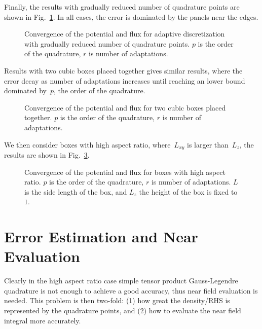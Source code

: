 \documentclass[prb,preprintnumbers,amsmath,amssymb, 10pt]{revtex4}
\begin{document}
Finally, the results with gradually reduced number of quadrature points are shown in Fig.~\ref{fig:3d-box-reduced-adapt-convergence}.
In all cases, the error is dominated by the panels near the edges.

\begin{figure}[htbp]
    \centering
    
    \caption{Convergence of the potential and flux for adaptive discretization with gradually reduced number of quadrature points. $p$ is the order of the quadrature, $r$ is number of adaptations.}
    \label{fig:3d-box-reduced-adapt-convergence}
\end{figure}

Results with two cubic boxes placed together gives similar results, where the error decay as number of adaptations increases until reaching an lower bound dominated by~$p$, the order of the quadrature.

\begin{figure}[htbp]
    \centering
    
    \caption{Convergence of the potential and flux for two cubic boxes placed together. $p$ is the order of the quadrature, $r$ is number of adaptations.}
    \label{fig:3d-double-box-convergence}
\end{figure}

We then consider boxes with high aspect ratio, where~$L_{xy}$ is larger than~$L_z$, the results are shown in Fig.~\ref{fig:3d-high-aspect-ratio-box-convergence}.

\begin{figure}[htbp]
    \centering
    
    \caption{Convergence of the potential and flux for boxes with high aspect ratio. $p$ is the order of the quadrature, $r$ is number of adaptations. $L$ is the side length of the box, and $L_z$ the height of the box is fixed to $1$.}
    \label{fig:3d-high-aspect-ratio-box-convergence}
\end{figure}

\newpage

\section{Error Estimation and Near Evaluation}

Clearly in the high aspect ratio case simple tensor product Gauss-Legendre quadrature is not enough to achieve a good accuracy, thus near field evaluation is needed.
This problem is then two-fold: (1) how great the density/RHS is represented by the quadrature points, and (2) how to evaluate the near field integral more accurately.
\end{document}
